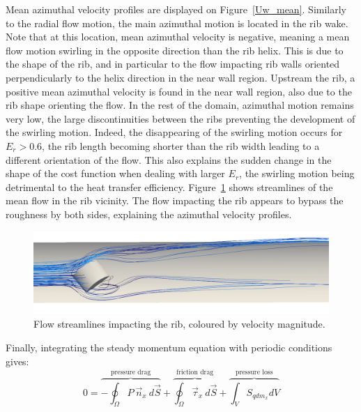 Mean azimuthal velocity profiles are displayed on Figure~\ref{Uw_mean}. Similarly to the radial flow motion, the main azimuthal motion is located in the rib wake. Note that at this location, mean azimuthal velocity is negative, meaning a mean flow motion swirling in the opposite direction than the rib helix. This is due to the shape of the rib, and in particular to the flow impacting rib walls oriented perpendicularly to the helix direction in the near wall region. Upstream the rib, a positive mean azimuthal velocity is found in the near wall region, also due to the rib shape orienting the flow. In the rest of the domain, azimuthal motion remains very low, the large discontinuities between the ribs preventing the development of the swirling motion. Indeed, the disappearing of the swirling motion occurs for $E_r > 0.6$, the rib length becoming shorter than the rib width leading to a different orientation of the flow. This also explains the sudden change in the shape of the cost function when dealing with larger $E_r$, the swirling motion being detrimental to the heat transfer efficiency. Figure~\ref{streamlines} shows streamlines of the mean flow in the rib vicinity. The flow impacting the rib appears to bypass the roughness by both sides, explaining the azimuthal velocity profiles.\\

\begin{figure}[h]
\centering
\includegraphics[width=\linewidth]{fig/applications/optim/Streamlines.png}
\caption{Flow streamlines impacting the rib, coloured by velocity magnitude.}
\label{streamlines}
\end{figure}

Finally, integrating the steady momentum equation with periodic conditions gives:
\begin{equation}
0 = \overbrace{- \oint_{\Omega} P ~ \vec{n}_x ~ d\vec{S}}^{\text{pressure drag}} + \overbrace{\oint_{\Omega} \vec{\tau}_x ~ d\vec{S}}^{\text{friction drag}} + \overbrace{\int_V S_{qdm_x} dV}^{\text{pressure loss}}
\label{momentum_eq}
\end{equation}

